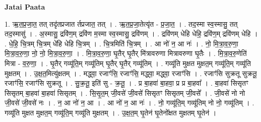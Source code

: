 \documentclass[17pt]{extarticle}
\begin{document}
\textbf{Jatai Paata} \newline

1. ऋ॒त॒प्र॒जा॒त॒ तत् तदृ॑तप्रजात र्तप्रजात॒ तत् । . ऋ॒त॒प्र॒जा॒तेत्यृ॑त - प्र॒जा॒त॒ । . तद॒स्मा स्व॒स्मासु॒ तत् तद॒स्मासु॑ । . अ॒स्मासु॒ द्रवि॑ण॒म् द्रवि॑ण म॒स्मा स्व॒स्मासु॒ द्रवि॑णम् । . द्रवि॑णम् धेहि धेहि॒ द्रवि॑ण॒म् द्रवि॑णम् धेहि । . धे॒हि॒ चि॒त्रम् चि॒त्रम् धे॑हि धेहि चि॒त्रम् । . चि॒त्रमिति॑ चि॒त्रम् । . आ नो॑ न॒ आ नः॑ । . नो॒ मि॒त्रा॒व॒रु॒णा॒ मि॒त्रा॒व॒रु॒णा॒ नो॒ नो॒ मि॒त्रा॒व॒रु॒णा॒ । . मि॒त्रा॒व॒रु॒णा॒ घृ॒तैर् घृ॒तैर् मि॑त्रावरुणा मित्रावरुणा घृ॒तैः । . मि॒त्रा॒व॒रु॒णेति॑ मित्रा - व॒रु॒णा॒ । . घृ॒तैर् गव्यू॑ति॒म् गव्यू॑तिम् घृ॒तैर् घृ॒तैर् गव्यू॑तिम् । . गव्यू॑ति मुक्षत मुक्षत॒म् गव्यू॑ति॒म् गव्यू॑ति मुक्षतम् । . उ॒क्ष॒त॒मित्यु॑क्षतम् । . मद्ध्वा॒ रजाꣳ॑सि॒ रजाꣳ॑सि॒ मद्ध्वा॒ मद्ध्वा॒ रजाꣳ॑सि । . रजाꣳ॑सि सुक्रतू सुक्रतू॒ रजाꣳ॑सि॒ रजाꣳ॑सि सुक्रतू । . सु॒क्र॒तू॒ इति॑ सु - क्र॒तू॒ । . प्र बा॒हवा॑ बा॒हवा॒ प्र प्र बा॒हवा᳚ । . बा॒हवा॑ सिसृतꣳ सिसृतम् बा॒हवा॑ बा॒हवा॑ सिसृतम् । . सि॒सृ॒त॒म् जी॒वसे॑ जी॒वसे॑ सिसृतꣳ सिसृतम् जी॒वसे᳚ । . जी॒वसे॑ नो नो जी॒वसे॑ जी॒वसे॑ नः । . न॒ आ नो॑ न॒ आ । . आ नो॑ न॒ आ नः॑ । . नो॒ गव्यू॑ति॒म् गव्यू॑तिम् नो नो॒ गव्यू॑तिम् । . गव्यू॑ति मुक्षत मुक्षत॒म् गव्यू॑ति॒म् गव्यू॑ति मुक्षतम् । . उ॒क्ष॒त॒म् घृ॒तेन॑ घृ॒तेनो᳚क्षत मुक्षतम् घृ॒तेन॑ । \newline
\end{document}

